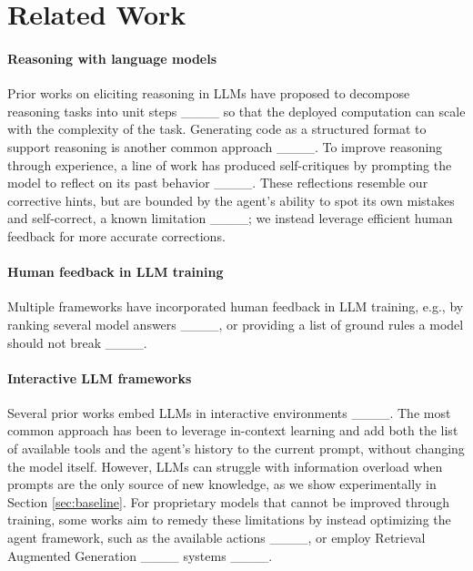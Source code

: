 \section{Related Work}
\label{sec:related_work}



\paragraph{Reasoning with language models}
Prior works on eliciting reasoning in LLMs have proposed to decompose reasoning tasks into unit steps ____ so that the deployed computation can scale with the complexity of the task. Generating code as a structured format to support reasoning is another common approach ____. To improve reasoning through experience, a line of work has produced self-critiques by prompting the model to reflect on its past behavior ____. These reflections resemble our corrective hints, but are bounded by the agent's ability to spot its own mistakes and self-correct, a known limitation ____; we instead leverage efficient human feedback for more accurate corrections.

\paragraph{Human feedback in LLM training} Multiple frameworks have incorporated human feedback in LLM training, e.g., by ranking several model answers ____, or providing a list of ground rules a model should not break ____. 

\paragraph{Interactive LLM frameworks} Several prior works embed LLMs in interactive environments ____. The most common approach has been to leverage in-context learning and add both the list of available tools and the agent's history to the current prompt, without changing the model itself.
However, LLMs can struggle with information overload when prompts are the only source of new knowledge, as we show experimentally in Section \ref{sec:baseline}. For proprietary models that cannot be improved through training, some works aim to remedy these limitations by instead optimizing the agent framework, such as the available actions ____, or employ Retrieval Augmented Generation ____ systems ____.

